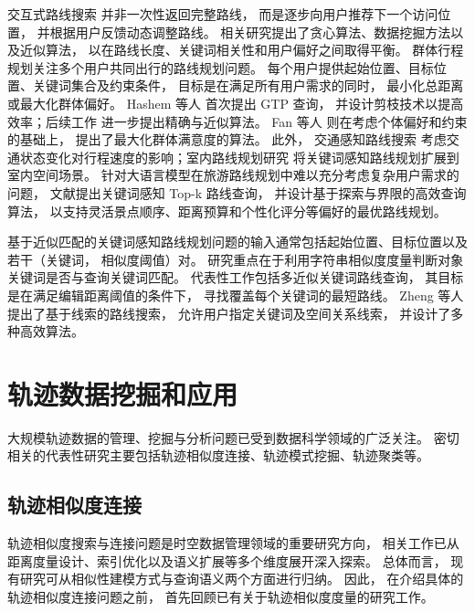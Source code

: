 交互式路线搜索  并非一次性返回完整路线， 而是逐步向用户推荐下一个访问位置， 并根据用户反馈动态调整路线。 相关研究提出了贪心算法、数据挖掘方法以及近似算法， 以在路线长度、关键词相关性和用户偏好之间取得平衡。 群体行程规划关注多个用户共同出行的路线规划问题。 每个用户提供起始位置、目标位置、关键词集合及约束条件， 目标是在满足所有用户需求的同时， 最小化总距离或最大化群体偏好。 Hashem 等人  首次提出 GTP 查询， 并设计剪枝技术以提高效率；后续工作  进一步提出精确与近似算法。 Fan 等人  则在考虑个体偏好和约束的基础上， 提出了最大化群体满意度的算法。 此外， 交通感知路线搜索 考虑交通状态变化对行程速度的影响；室内路线规划研究  将关键词感知路线规划扩展到室内空间场景。 针对大语言模型在旅游路线规划中难以充分考虑复杂用户需求的问题， 文献提出关键词感知 Top-k 路线查询， 并设计基于探索与界限的高效查询算法， 以支持灵活景点顺序、距离预算和个性化评分等偏好的最优路线规划。

基于近似匹配的关键词感知路线规划问题的输入通常包括起始位置、目标位置以及若干（关键词， 相似度阈值）对。 研究重点在于利用字符串相似度度量判断对象关键词是否与查询关键词匹配。 代表性工作包括多近似关键词路线查询， 其目标是在满足编辑距离阈值的条件下， 寻找覆盖每个关键词的最短路线。 Zheng 等人  提出了基于线索的路线搜索， 允许用户指定关键词及空间关系线索， 并设计了多种高效算法。


\section{轨迹数据挖掘和应用}
大规模轨迹数据的管理、挖掘与分析问题已受到数据科学领域的广泛关注。 密切相关的代表性研究主要包括轨迹相似度连接、轨迹模式挖掘、轨迹聚类等。

\subsection{轨迹相似度连接}
轨迹相似度搜索与连接问题是时空数据管理领域的重要研究方向， 相关工作已从距离度量设计、索引优化以及语义扩展等多个维度展开深入探索。 总体而言， 现有研究可从相似性建模方式与查询语义两个方面进行归纳。 因此， 在介绍具体的轨迹相似度连接问题之前， 首先回顾已有关于轨迹相似度度量的研究工作。
